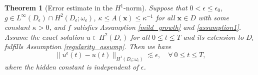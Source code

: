 \documentclass[3p,times]{elsarticle}
\newtheorem{theorem}{Theorem}[section]
\numberwithin{equation}{section}
\newcommand{\dd}{\,{\rm d}}
\begin{document}


\begin{theorem}[Error estimate in the $H^1$-norm]
	\label{thm5}
	Suppose that $0<\epsilon\leq \epsilon_0$,  $g\in L^{\infty}(D_{\epsilon})\cap H^2(D_{\epsilon};\omega_{\epsilon})$, $\kappa\leq A(\bm x)\leq \kappa^{-1}$ for all $\bm x \in D$ with some constant $\kappa>0$, and $f$ satisfies  Assumption \ref{mild_growth} and \ref{assumption1}. Assume the exact solution $u\in H^2(D_{\epsilon})$ for all $0\leq t \leq T$ and its extension to $D_\epsilon$ fulfills Assumption  \ref{regularity_assump}. Then we have
	\begin{equation}
		\label{thm5-1}
		\|u^{\epsilon}(t)-u(t)\|_{H^1(D_{\epsilon};\omega_{\epsilon})}\lesssim \epsilon, \quad \forall\ 0 \leq t\leq T,
	\end{equation}
	where the hidden constant is independent of $\epsilon$.
	
\end{theorem}
\end{document}
